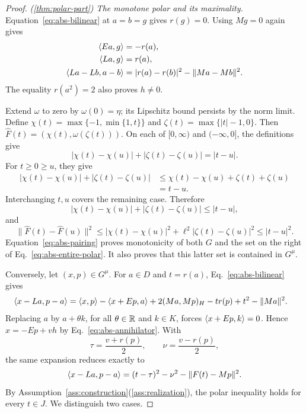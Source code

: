 \begin{proof}
\noindent\textit{\textup{(\ref{thm:polar-part})} The monotone polar and its maximality.}
Equation~\eqref{eq:abs-bilinear} at $a=b=g$ gives $r(g)=0$.
Using $Mg=0$ again gives
\begin{equation}
\begin{aligned}
\langle Ea,g\rangle&=-r(a),\\
\langle La,g\rangle&=r(a),\\
\langle La-Lb,a-b\rangle&=|r(a)-r(b)|^2-\|Ma-Mb\|^2.
\end{aligned}
\label{eq:abs-pairing}
\end{equation}
The equality $r(a^2)=2$ also proves $h\ne0$.

Extend $\omega$ to zero by $\omega(0)=\eta$; its Lipschitz bound
persists by the norm limit. Define
$\chi(t)=\max\{-1,\min\{1,t\}\}$ and
$\zeta(t)=\max\{|t|-1,0\}$. Then
$\widehat F(t)=(\chi(t),\omega(\zeta(t)))$.
On each of $[0,\infty)$ and $(-\infty,0]$, the definitions give
\[
|\chi(t)-\chi(u)|+|\zeta(t)-\zeta(u)|=|t-u|.
\]
For $t\ge0\ge u$, they give
\[
\begin{aligned}
|\chi(t)-\chi(u)|+|\zeta(t)-\zeta(u)|
&\le \chi(t)-\chi(u)+\zeta(t)+\zeta(u)\\
&=t-u.
\end{aligned}
\]
Interchanging $t,u$ covers the remaining case. Therefore
\[
|\chi(t)-\chi(u)|+|\zeta(t)-\zeta(u)|\le|t-u|,
\]
and
\[
\|\widehat F(t)-\widehat F(u)\|^2
\le|\chi(t)-\chi(u)|^2+\ell^2|\zeta(t)-\zeta(u)|^2
\le|t-u|^2.
\]
Equation~\eqref{eq:abs-pairing} proves monotonicity of both $G$
and the set on the right of Eq.~\eqref{eq:abs-entire-polar}.
It also proves that this latter set is contained in $G^\mu$.

Conversely, let $(x,p)\in G^\mu$. For $a\in D$ and $t=r(a)$,
Eq.~\eqref{eq:abs-bilinear} gives
\begin{align*}
\langle x-La,p-a\rangle
={}&\langle x,p\rangle-\langle x+Ep,a\rangle
       +2(Ma,Mp)_H-t r(p)+t^2-\|Ma\|^2.
\end{align*}
Replacing $a$ by $a+\theta k$, for all $\theta\in\mathbb R$ and
$k\in K$, forces $\langle x+Ep,k\rangle=0$. Hence
$x=-Ep+v h$ by Eq.~\eqref{eq:abs-annihilator}. With
\[
\tau=\frac{v+r(p)}2,\qquad \nu=\frac{v-r(p)}2,
\]
the same expansion reduces exactly to
\begin{equation}
\langle x-La,p-a\rangle=(t-\tau)^2-\nu^2-\|F(t)-Mp\|^2.
\label{eq:abs-polar-square}
\end{equation}
By Assumption~\ref{ass:construction}\textup{(\ref{ass:realization})}, the polar inequality holds for every $t\in J$.
We distinguish two cases.


\end{proof}
